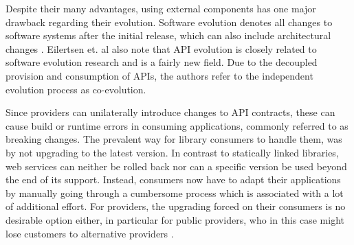 Despite their many advantages, using external components has one major drawback regarding their evolution. Software evolution denotes all changes to software systems after the initial release, which can also include architectural changes \cite{eilertsen_exploring_2018}. Eilertsen et. al also note that \ac{API} evolution is closely related to software evolution research and is a fairly new field. Due to the decoupled provision and consumption of APIs, the authors refer to the independent evolution process as co-evolution. 

Since providers can unilaterally introduce changes to API contracts, these can cause build or runtime errors in consuming applications, commonly referred to as breaking changes. The prevalent way for library consumers to handle them, was by not upgrading to the latest version. In contrast to statically linked libraries, web services can neither be rolled back nor can a specific version be used beyond the end of its support. Instead, consumers now have to adapt their applications by manually going through a cumbersome process which is associated with a lot of additional effort. For providers, the upgrading forced on their consumers is no desirable option either, in particular for public providers, who in this case might lose customers to alternative providers \cite[p.3]{lubke_interface_2019}. 




